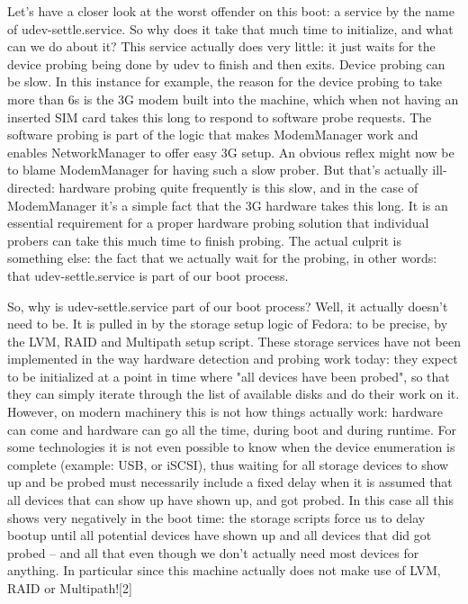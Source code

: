 \documentclass[titlepage]{article}
\begin{document}
Let's have a closer look at the worst offender on this boot: a service by the name of udev-settle.service. So why does it take that much time to initialize, and what can we do about it? This service actually does very little: it just waits for the device probing being done by udev to finish and then exits. Device probing can be slow. In this instance for example, the reason for the device probing to take more than 6s is the 3G modem built into the machine, which when not having an inserted SIM card takes this long to respond to software probe requests. The software probing is part of the logic that makes ModemManager work and enables NetworkManager to offer easy 3G setup. An obvious reflex might now be to blame ModemManager for having such a slow prober. But that's actually ill-directed: hardware probing quite frequently is this slow, and in the case of ModemManager it's a simple fact that the 3G hardware takes this long. It is an essential requirement for a proper hardware probing solution that individual probers can take this much time to finish probing. The actual culprit is something else: the fact that we actually wait for the probing, in other words: that udev-settle.service is part of our boot process.

So, why is udev-settle.service part of our boot process? Well, it actually doesn't need to be. It is pulled in by the storage setup logic of Fedora: to be precise, by the LVM, RAID and Multipath setup script. These storage services have not been implemented in the way hardware detection and probing work today: they expect to be initialized at a point in time where "all devices have been probed", so that they can simply iterate through the list of available disks and do their work on it. However, on modern machinery this is not how things actually work: hardware can come and hardware can go all the time, during boot and during runtime. For some technologies it is not even possible to know when the device enumeration is complete (example: USB, or iSCSI), thus waiting for all storage devices to show up and be probed must necessarily include a fixed delay when it is assumed that all devices that can show up have shown up, and got probed. In this case all this shows very negatively in the boot time: the storage scripts force us to delay bootup until all potential devices have shown up and all devices that did got probed -- and all that even though we don't actually need most devices for anything. In particular since this machine actually does not make use of LVM, RAID or Multipath![2]
\end{document}
